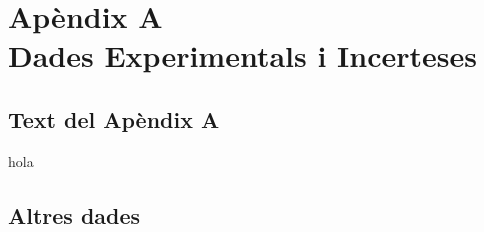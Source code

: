\documentclass[a4paper,11pt]{report}
\renewcommand{\thesection}{\thechapter.\arabic{section}} %
\begin{document}
	\chapter*{Apèndix A\\[0.5cm] Dades Experimentals i Incerteses}
	
	\setcounter{section}{0} %
	\renewcommand{\thesection}{A.\arabic{section}} %
	
	\section{Text del Apèndix A} %
	hola
	\section{Altres dades} %
	
\end{document}
